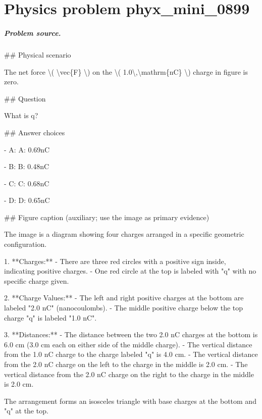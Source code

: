 
\chapter{Physics problem phyx\_mini\_0899}
\label{ch:PhyXMiniProblems_problem_phyx_mini_0899}

\paragraph{Problem source.}
\#\# Physical scenario

The net force \textbackslash{}( \textbackslash{}vec\{F\} \textbackslash{}) on the \textbackslash{}( 1.0\textbackslash{},\textbackslash{}mathrm\{nC\} \textbackslash{}) charge in figure is zero.

\#\# Question

What is q?

\#\# Answer choices

- A: A: 0.69nC

- B: B: 0.48nC

- C: C: 0.68nC

- D: D: 0.65nC

\#\# Figure caption (auxiliary; use the image as primary evidence)

The image is a diagram showing four charges arranged in a specific geometric configuration.

1. **Charges:**
   - There are three red circles with a positive sign inside, indicating positive charges. 
   - One red circle at the top is labeled with "q" with no specific charge given.

2. **Charge Values:**
   - The left and right positive charges at the bottom are labeled "2.0 nC" (nanocoulombs).
   - The middle positive charge below the top charge "q" is labeled "1.0 nC".

3. **Distances:**
   - The distance between the two 2.0 nC charges at the bottom is 6.0 cm (3.0 cm each on either side of the middle charge).
   - The vertical distance from the 1.0 nC charge to the charge labeled "q" is 4.0 cm.
   - The vertical distance from the 2.0 nC charge on the left to the charge in the middle is 2.0 cm.
   - The vertical distance from the 2.0 nC charge on the right to the charge in the middle is 2.0 cm.

The arrangement forms an isosceles triangle with base charges at the bottom and "q" at the top.


